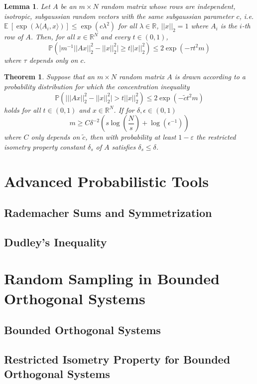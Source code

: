 \documentclass[10pt,a4paper]{article}
\theoremstyle{thmstyle}
\newtheorem{lemma}{Lemma}
\newtheorem{theorem}{Theorem}
\newcommand{\E}{\mathbb{E}~}
\renewcommand{\Pr}[1]{\mathbb{P}\left( #1 \right)}
\begin{document}
\begin{lemma}
  Let $A$ be an $m \times N$ random matrix whose rows are independent, isotropic, subgaussian random vectors with the same subgaussian parameter $c$, i.e. $\E\left[ \exp(\lambda \langle A_{i}, x \rangle) \right] \le \exp(c \lambda^{2})$ for all $\lambda \in \mathbb{R}$, $||x||_{2} = 1$ where $A_{i}$ is the $i$-th row of $A$.
  Then, for all $x \in \mathbb{R}^{N}$ and every $t \in (0, 1)$,
  \begin{equation*}
    \Pr{\big| m^{-1} ||Ax||_{2}^{2} - ||x||_{2}^{2} \big| \ge t||x||_{2}^{2}} \le 2\exp(-\tau t^{2} m)
  \end{equation*}
  where $\tau$ depends only on $c$.
\end{lemma}

\begin{theorem}
  Suppose that an $m \times N$ random matrix $A$ is drawn according to a probability distribution for which the concentration inequality
  \begin{equation*}
    \Pr{\big| ||Ax||_{2}^{2} - ||x||_{2}^{2} \big| > t||x||_{2}^{2}} \le 2\exp(-\tilde{c}t^{2}m)
  \end{equation*}
  holds for all $t \in (0, 1)$ and $x \in \mathbb{R}^{N}$.
  If for $\delta, \epsilon \in (0, 1)$
  \begin{equation*}
    m \ge C \delta^{-2} \left( s \log\left( \frac{N}{s} \right) + \log(\epsilon^{-1}) \right)
  \end{equation*}
  where $C$ only depends on $\tilde{c}$, then with probability at least $1 - \varepsilon$ the restricted isometry property constant $\delta_{s}$ of $A$ satisfies $\delta_{s} \le \delta$.
\end{theorem}

\section{Advanced Probabilistic Tools}

\subsection{Rademacher Sums and Symmetrization}

\subsection{Dudley's Inequality}

\section{Random Sampling in Bounded Orthogonal Systems}

\subsection{Bounded Orthogonal Systems}

\subsection{Restricted Isometry Property for Bounded Orthogonal Systems}
\end{document}
